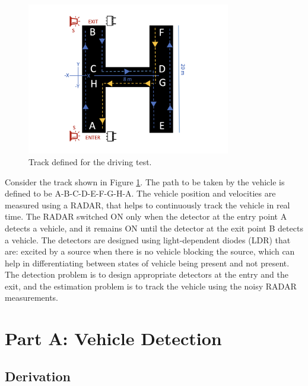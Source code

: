 \documentclass[11pt]{article}
\begin{document}
\begin{figure}[h]
	\centering
	\includegraphics[width=3.5in]{../results/path.png}
\caption{Track defined for the driving test.}
\label{fig:path}
\end{figure}
Consider the track shown in Figure \ref{fig:path}. The path to be taken by the vehicle is defined to be A-B-C-D-E-F-G-H-A. The vehicle position and velocities are measured using a RADAR, that helps to continuously track the vehicle in real time. The RADAR switched ON only when the detector at the entry point A detects a vehicle, and it remains ON until the detector at the exit point B detects a vehicle. The detectors are designed using light-dependent diodes (LDR) that are: excited by a source when there is no vehicle blocking the source, which can help in differentiating between states of vehicle being present and not present. The detection problem is to design appropriate detectors at the entry and the exit, and the estimation problem is to track the vehicle using the noisy RADAR measurements.


\section{Part A: Vehicle Detection}
\label{sec:partA_Detection}

\subsection{Derivation}
\label{subsec:partA_derivation}
\end{document}
